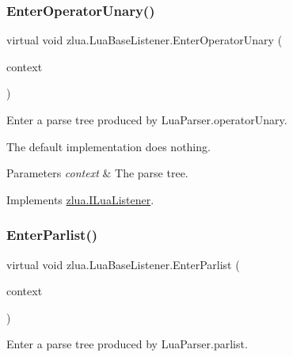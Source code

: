 \subsubsection{\texorpdfstring{Enter\+Operator\+Unary()}{EnterOperatorUnary()}}
{\footnotesize\ttfamily virtual void zlua.\+Lua\+Base\+Listener.\+Enter\+Operator\+Unary (\begin{DoxyParamCaption}\item[{\mbox{[}\+Not\+Null\mbox{]} \mbox{\hyperlink{classzlua_1_1_lua_parser_1_1_operator_unary_context}{Lua\+Parser.\+Operator\+Unary\+Context}}}]{context }\end{DoxyParamCaption})\hspace{0.3cm}{\ttfamily [virtual]}}



Enter a parse tree produced by Lua\+Parser.\+operator\+Unary. 

The default implementation does nothing.


\begin{DoxyParams}{Parameters}
{\em context} & The parse tree.\\
\hline
\end{DoxyParams}


Implements \mbox{\hyperlink{interfacezlua_1_1_i_lua_listener_a7b7f6eceb594a19cd7ee783bdb209c8e}{zlua.\+I\+Lua\+Listener}}.

\mbox{\label{classzlua_1_1_lua_base_listener_a731d7b4d2ae1ef89c04c01da08cddbc7}} 
\subsubsection{\texorpdfstring{Enter\+Parlist()}{EnterParlist()}}
{\footnotesize\ttfamily virtual void zlua.\+Lua\+Base\+Listener.\+Enter\+Parlist (\begin{DoxyParamCaption}\item[{\mbox{[}\+Not\+Null\mbox{]} \mbox{\hyperlink{classzlua_1_1_lua_parser_1_1_parlist_context}{Lua\+Parser.\+Parlist\+Context}}}]{context }\end{DoxyParamCaption})\hspace{0.3cm}{\ttfamily [virtual]}}



Enter a parse tree produced by Lua\+Parser.\+parlist. 

